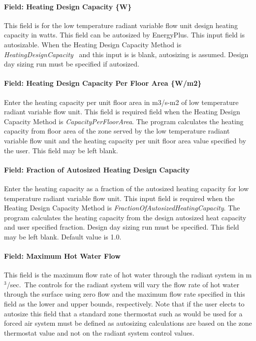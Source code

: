 \paragraph{Field: Heating Design Capacity \{W\}}\label{field-heating-design-capacity-w-5}

This field is for the low temperature radiant variable flow unit design heating capacity in watts. This field can be autosized by EnergyPlus. This input field is autosizable. When the Heating Design Capacity Method is \emph{HeatingDesignCapacity}~ and this input is is blank, autosizing is assumed. Design day sizing run must be specified if autosized.

\paragraph{Field: Heating Design Capacity Per Floor Area \{W/m2\}}\label{field-heating-design-capacity-per-floor-area-wm2-5}

Enter the heating capacity per unit floor area in m3/s-m2 of low temperature radiant variable flow unit. This field is required field when the Heating Design Capacity Method is \emph{CapacityPerFloorArea}. The program calculates the heating capacity from floor area of the zone served by the low temperature radiant variable flow unit and the heating capacity per unit floor area value specified by the user. This field may be left blank.

\paragraph{Field: Fraction of Autosized Heating Design Capacity}\label{field-fraction-of-autosized-heating-design-capacity-5}

Enter the heating capacity as a fraction of the autosized heating capacity for low temperature radiant variable flow unit. This input field is required when the Heating Design Capacity Method is \emph{FractionOfAutosizedHeatingCapacity}. The program calculates the heating capacity from the design autosized heat capacity and user specified fraction. Design day sizing run must be specified. This field may be left blank. Default value is 1.0.

\paragraph{Field: Maximum Hot Water Flow}\label{field-maximum-hot-water-flow}

This field is the maximum flow rate of hot water through the radiant system in m\(^{3}\)/sec.~The controls for the radiant system will vary the flow rate of hot water through the surface using zero flow and the maximum flow rate specified in this field as the lower and upper bounds, respectively. Note that if the user elects to autosize this field that a standard zone thermostat such as would be used for a forced air system must be defined as autosizing calculations are based on the zone thermostat value and not on the radiant system control values.

